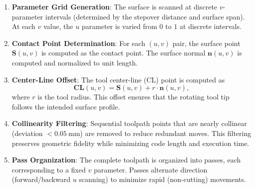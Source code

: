 \documentclass[a4paper,12pt]{article}
\begin{document}
\begin{enumerate}
  \item \textbf{Parameter Grid Generation}: The surface is scanned at discrete
    $v$-parameter intervals (determined by the stepover distance and surface
    span). At each $v$ value, the $u$ parameter is varied from $0$ to $1$ at
    discrete intervals.

  \item \textbf{Contact Point Determination}: For each $(u, v)$ pair, the
    surface point $\mathbf{S}(u, v)$ is computed as the contact point. The
    surface normal $\mathbf{n}(u, v)$ is computed and normalized to unit
    length.

  \item \textbf{Center-Line Offset}: The tool center-line (CL) point is
    computed as
    \begin{equation}
      \mathbf{CL}(u, v) = \mathbf{S}(u, v) + r \cdot \mathbf{n}(u, v),
    \end{equation}
    where $r$ is the tool radius. This offset ensures that the rotating tool
    tip follows the intended surface profile.

  \item \textbf{Collinearity Filtering}: Sequential toolpath points that are
    nearly collinear (deviation $< 0.05~\text{mm}$) are removed to reduce
    redundant moves. This filtering preserves geometric fidelity while
    minimizing code length and execution time.

  \item \textbf{Pass Organization}: The complete toolpath is organized into
    passes, each corresponding to a fixed $v$ parameter. Passes alternate
    direction (forward/backward $u$ scanning) to minimize rapid (non-cutting)
    movements.
\end{enumerate}
\end{document}

